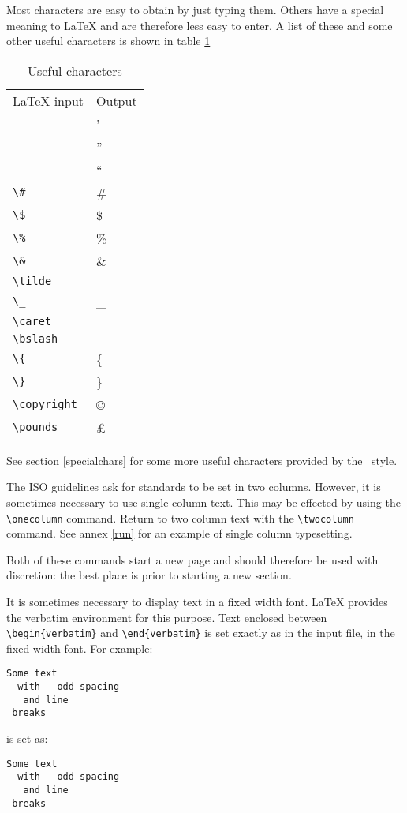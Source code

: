 \label{guide.unusual}
Most \cite{charset} characters are easy to obtain by just typing them.
Others have a special meaning to LaTeX and are therefore less easy to enter.
A list of these and some other useful characters is shown in table
\ref{table.chars}
\begin{table}[ht]
\caption{Useful characters}
\label{table.chars}
\begin{center}
\begin{tabular}{ll}
LaTeX input	&	Output \\
\prog{\rquote}	&	' \\
\prog{\rquote\rquote}	&	'' \\
\prog{\lquote\lquote}	&	`` \\
\verb|\#|	&	\# \\
\verb|\$|	&	\$ \\
\verb|\%|	&	\% \\
\verb|\&|	&	\& \\
\verb|\tilde|	&	\tilde \\
\verb|\_|	&	\_ \\
\verb|\caret|	&	\caret \\
\verb|\bslash|	&	\bslash \\
\verb|\{|	&	\{ \\
\verb|\}|	&	\} \\
\verb|\copyright|	&	\copyright \\
\verb|\pounds|	&	\pounds
\end{tabular}
\end{center}
\end{table}

See section \ref{specialchars} for some more useful characters provided by
the \iso\ style.

The ISO guidelines ask for standards to be set in two columns.
However, it is sometimes necessary to use single column text.
This may be effected by using the \verb|\onecolumn| command.
Return to two column text with the \verb|\twocolumn| command.
See annex \ref{run} for an example of single column typesetting.

Both of these commands start a new page and should therefore be used with
discretion: the best place is prior to starting a new section.

\label{guide.verbatim}
It is sometimes necessary to display text in a fixed width font.
LaTeX provides the verbatim environment for this purpose.
Text enclosed between \verb|\begin{verbatim}| and
\verb|\end{verbatim}| is set exactly as in the input file, in the fixed
width font.
For example:
\begin{example}
\begin{verbatim}
Some text
  with   odd spacing
   and line
 breaks
\end{verbatim}
\end{example}
is set as:
\begin{verbatim}
Some text
  with   odd spacing
   and line
 breaks
\end{verbatim}

